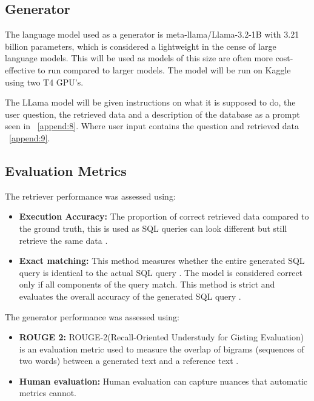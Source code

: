\documentclass[11pt]{article}
\begin{document}
\subsection{Generator}

The language model used as a generator is meta-llama/Llama-3.2-1B \cite{Llama} with 3.21 billion parameters, which is considered a lightweight in the cense of large language models\cite{touvron2023llama}. This will be used as models of this size are often more cost-effective to run compared to larger models. The model will be run on Kaggle using two T4 GPU's. 

The LLama model will be given instructions on what it is supposed to do, the user question, the retrieved data and a description of the database as a prompt seen in ~\ref{append:8}. Where user input contains the question and retrieved data ~\ref{append:9}.

\subsection{Evaluation Metrics}
The retriever performance was assessed using:
\begin{itemize}
    \item \textbf{Execution Accuracy:} The proportion of correct retrieved data compared to the ground truth, this is used as SQL queries can look different but still retrieve the same data \cite{spider}.
    \item \textbf{Exact matching:} This method measures whether the entire generated SQL query is identical to the actual SQL query \cite{spider}. The model is considered correct only if all components of the query match. This method is strict and evaluates the overall accuracy of the generated SQL query .
\end{itemize}

The generator performance was assessed using:
\begin{itemize}
    \item \textbf{ROUGE 2:} ROUGE-2(Recall-Oriented Understudy for Gisting Evaluation) is an evaluation metric used to measure the overlap of bigrams (sequences of two words) between a generated text and a reference text \cite{ROUGE}.
    \item \textbf{Human evaluation:} Human evaluation can capture nuances that automatic metrics cannot.
    
\end{itemize}
\end{document}
